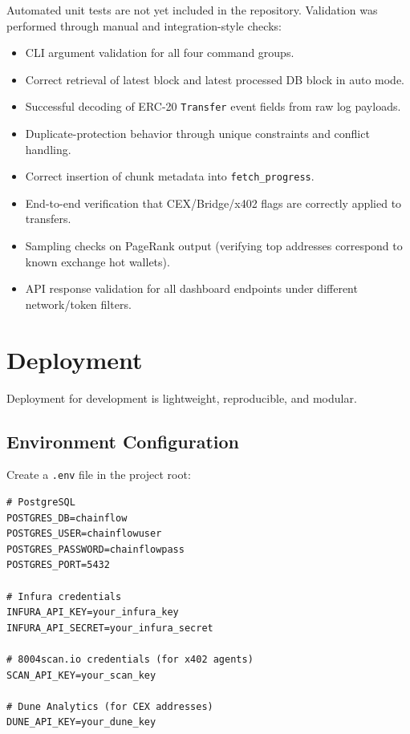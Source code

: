\documentclass[a4paper,12pt]{report}
\begin{document}
Automated unit tests are not yet included in the repository. Validation was performed through
manual and integration-style checks:
\begin{itemize}
\item CLI argument validation for all four command groups.
\item Correct retrieval of latest block and latest processed DB block in auto mode.
\item Successful decoding of ERC-20 \texttt{Transfer} event fields from raw log payloads.
\item Duplicate-protection behavior through unique constraints and conflict handling.
\item Correct insertion of chunk metadata into \texttt{fetch\_progress}.
\item End-to-end verification that CEX/Bridge/x402 flags are correctly applied to transfers.
\item Sampling checks on PageRank output (verifying top addresses correspond to known exchange
hot wallets).
\item API response validation for all dashboard endpoints under different network/token filters.
\end{itemize}

\section{Deployment}

Deployment for development is lightweight, reproducible, and modular.

\subsection*{Environment Configuration}
Create a \texttt{.env} file in the project root:

\begin{verbatim}
# PostgreSQL
POSTGRES_DB=chainflow
POSTGRES_USER=chainflowuser
POSTGRES_PASSWORD=chainflowpass
POSTGRES_PORT=5432

# Infura credentials
INFURA_API_KEY=your_infura_key
INFURA_API_SECRET=your_infura_secret

# 8004scan.io credentials (for x402 agents)
SCAN_API_KEY=your_scan_key

# Dune Analytics (for CEX addresses)
DUNE_API_KEY=your_dune_key
\end{verbatim}
\end{document}
